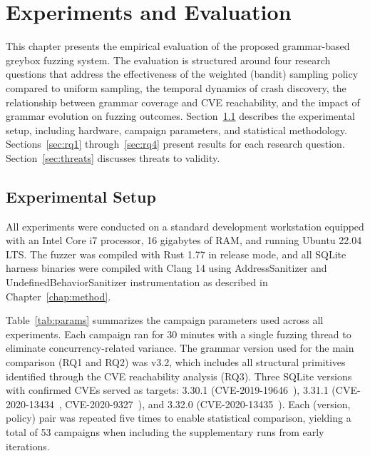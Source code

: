 \chapter{Experiments and Evaluation}
\label{chap:experiments}

This chapter presents the empirical evaluation of the proposed grammar-based greybox fuzzing system. The evaluation is structured around four research questions that address the effectiveness of the weighted (bandit) sampling policy compared to uniform sampling, the temporal dynamics of crash discovery, the relationship between grammar coverage and CVE reachability, and the impact of grammar evolution on fuzzing outcomes. Section~\ref{sec:setup} describes the experimental setup, including hardware, campaign parameters, and statistical methodology. Sections~\ref{sec:rq1} through~\ref{sec:rq4} present results for each research question. Section~\ref{sec:threats} discusses threats to validity.

\section{Experimental Setup}
\label{sec:setup}

All experiments were conducted on a standard development workstation equipped with an Intel Core i7 processor, 16 gigabytes of RAM, and running Ubuntu 22.04 LTS. The fuzzer was compiled with Rust 1.77 in release mode, and all SQLite harness binaries were compiled with Clang 14 using AddressSanitizer and UndefinedBehaviorSanitizer instrumentation as described in Chapter~\ref{chap:method}.

Table~\ref{tab:params} summarizes the campaign parameters used across all experiments. Each campaign ran for 30 minutes with a single fuzzing thread to eliminate concurrency-related variance. The grammar version used for the main comparison (RQ1 and RQ2) was v3.2, which includes all structural primitives identified through the CVE reachability analysis (RQ3). Three SQLite versions with confirmed CVEs served as targets: 3.30.1 (CVE-2019-19646~\cite{cve201919646}), 3.31.1 (CVE-2020-13434~\cite{cve202013434}, CVE-2020-9327~\cite{cve20209327}), and 3.32.0 (CVE-2020-13435~\cite{cve202013435}). Each (version, policy) pair was repeated five times to enable statistical comparison, yielding a total of 53 campaigns when including the supplementary runs from early iterations.

